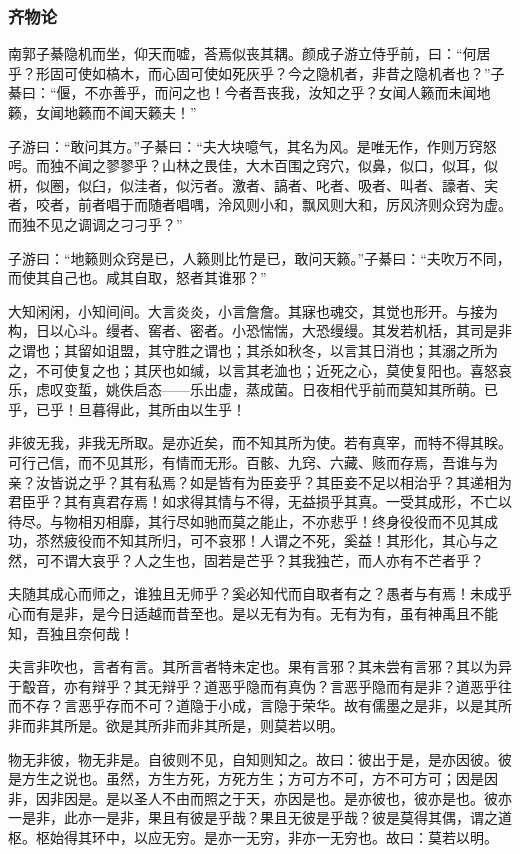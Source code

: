 \documentclass[]{article}
\begin{document}
\hypertarget{header-n526}{%
\subsubsection{齐物论}\label{header-n526}}

南郭子綦隐机而坐，仰天而嘘，荅焉似丧其耦。颜成子游立侍乎前，曰：``何居乎？形固可使如槁木，而心固可使如死灰乎？今之隐机者，非昔之隐机者也？''子綦曰：``偃，不亦善乎，而问之也！今者吾丧我，汝知之乎？女闻人籁而未闻地籁，女闻地籁而不闻天籁夫！''

子游曰：``敢问其方。''子綦曰：``夫大块噫气，其名为风。是唯无作，作则万窍怒呺。而独不闻之翏翏乎？山林之畏佳，大木百围之窍穴，似鼻，似口，似耳，似枅，似圈，似臼，似洼者，似污者。激者、謞者、叱者、吸者、叫者、譹者、宎者，咬者，前者唱于而随者唱喁，泠风则小和，飘风则大和，厉风济则众窍为虚。而独不见之调调之刁刁乎？''

子游曰：``地籁则众窍是已，人籁则比竹是已，敢问天籁。''子綦曰：``夫吹万不同，而使其自己也。咸其自取，怒者其谁邪？''

大知闲闲，小知间间。大言炎炎，小言詹詹。其寐也魂交，其觉也形开。与接为构，日以心斗。缦者、窖者、密者。小恐惴惴，大恐缦缦。其发若机栝，其司是非之谓也；其留如诅盟，其守胜之谓也；其杀如秋冬，以言其日消也；其溺之所为之，不可使复之也；其厌也如缄，以言其老洫也；近死之心，莫使复阳也。喜怒哀乐，虑叹变蜇，姚佚启态------乐出虚，蒸成菌。日夜相代乎前而莫知其所萌。已乎，已乎！旦暮得此，其所由以生乎！

非彼无我，非我无所取。是亦近矣，而不知其所为使。若有真宰，而特不得其眹。可行己信，而不见其形，有情而无形。百骸、九窍、六藏、赅而存焉，吾谁与为亲？汝皆说之乎？其有私焉？如是皆有为臣妾乎？其臣妾不足以相治乎？其递相为君臣乎？其有真君存焉！如求得其情与不得，无益损乎其真。一受其成形，不亡以待尽。与物相刃相靡，其行尽如驰而莫之能止，不亦悲乎！终身役役而不见其成功，苶然疲役而不知其所归，可不哀邪！人谓之不死，奚益！其形化，其心与之然，可不谓大哀乎？人之生也，固若是芒乎？其我独芒，而人亦有不芒者乎？

夫随其成心而师之，谁独且无师乎？奚必知代而自取者有之？愚者与有焉！未成乎心而有是非，是今日适越而昔至也。是以无有为有。无有为有，虽有神禹且不能知，吾独且奈何哉！

夫言非吹也，言者有言。其所言者特未定也。果有言邪？其未尝有言邪？其以为异于鷇音，亦有辩乎？其无辩乎？道恶乎隐而有真伪？言恶乎隐而有是非？道恶乎往而不存？言恶乎存而不可？道隐于小成，言隐于荣华。故有儒墨之是非，以是其所非而非其所是。欲是其所非而非其所是，则莫若以明。

物无非彼，物无非是。自彼则不见，自知则知之。故曰：彼出于是，是亦因彼。彼是方生之说也。虽然，方生方死，方死方生；方可方不可，方不可方可；因是因非，因非因是。是以圣人不由而照之于天，亦因是也。是亦彼也，彼亦是也。彼亦一是非，此亦一是非，果且有彼是乎哉？果且无彼是乎哉？彼是莫得其偶，谓之道枢。枢始得其环中，以应无穷。是亦一无穷，非亦一无穷也。故曰：莫若以明。
\end{document}

